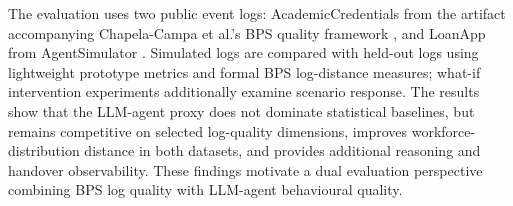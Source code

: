 The evaluation uses two public event logs: AcademicCredentials from the
artifact accompanying Chapela-Campa et al.'s BPS quality framework
\cite{chapela2025quality}, and LoanApp from AgentSimulator
\cite{kirchdorfer2024agentsimulator}. Simulated logs are compared with
held-out logs using lightweight prototype metrics and formal BPS
log-distance measures; what-if intervention experiments additionally
examine scenario response. The results show that the LLM-agent proxy does not
dominate statistical baselines, but remains competitive on selected
log-quality dimensions, improves workforce-distribution distance in
both datasets, and provides additional reasoning and handover
observability. These findings motivate a dual evaluation perspective
combining BPS log quality with LLM-agent behavioural quality.
